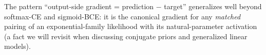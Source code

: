 \begin{remark}
The pattern ``output-side gradient = prediction $-$ target'' generalizes well beyond softmax-CE and
sigmoid-BCE: it is the canonical gradient for any \emph{matched} pairing of an exponential-family likelihood
with its natural-parameter activation (a fact we will revisit when discussing conjugate priors and
generalized linear models).
\end{remark}
